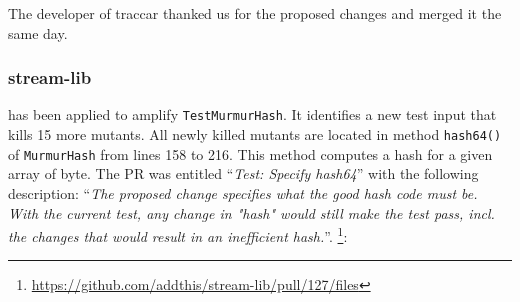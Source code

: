 The developer of traccar thanked us for the proposed changes and merged it the same day.


\subsubsection{stream-lib}



\dspot has been applied to amplify \texttt{TestMurmurHash}. 
It identifies a new test input that kills 15 more mutants.
All newly killed mutants are located in method \texttt{hash64()} of \texttt{MurmurHash} from lines 158 to 216.
This method computes a hash for a given array of byte. 
The PR was entitled ``\emph{Test: Specify hash64}'' with the following description: ``\emph{The proposed change specifies what the good hash code must be. With the current test, any change in "hash" would still make the test pass, incl. the changes that would result in an inefficient hash.}''. \footnote{\url{https://github.com/addthis/stream-lib/pull/127/files}}:
\begin{figure}[H]
	\centering{}
\end{figure}

